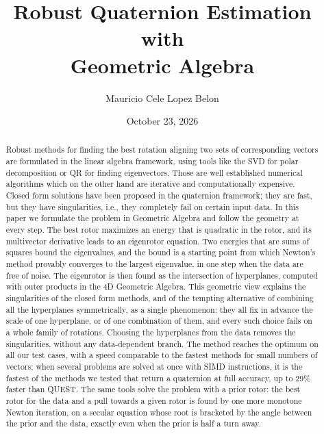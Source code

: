 \documentclass{birkjour}
\theoremstyle{definition}
\theoremstyle{remark}
\numberwithin{equation}{section}
\begin{document}
\title[Robust Quaternion Estimation with Geometric Algebra]
 {Robust Quaternion Estimation with \\Geometric Algebra}

\author[Mauricio Cele Lopez Belon]{Mauricio Cele Lopez Belon}
\address{Madrid, Spain}



\date{October 23, 2026}

\begin{abstract}
Robust methods for finding the best rotation aligning two sets of corresponding vectors are formulated in the linear algebra framework, using tools like the SVD for polar decomposition or QR for finding eigenvectors. Those are well established numerical algorithms which on the other hand are iterative and computationally expensive. Closed form solutions have been proposed in the quaternion framework; they are fast, but they have singularities, i.e., they completely fail on certain input data. In this paper we formulate the problem in Geometric Algebra and follow the geometry at every step. The best rotor maximizes an energy that is quadratic in the rotor, and its multivector derivative leads to an eigenrotor equation. Two energies that are sums of squares bound the eigenvalues, and the bound is a starting point from which Newton's method provably converges to the largest eigenvalue, in one step when the data are free of noise. The eigenrotor is then found as the intersection of hyperplanes, computed with outer products in the 4D Geometric Algebra. This geometric view explains the singularities of the closed form methods, and of the tempting alternative of combining all the hyperplanes symmetrically, as a single phenomenon: they all fix in advance the scale of one hyperplane, or of one combination of them, and every such choice fails on a whole family of rotations. Choosing the hyperplanes from the data removes the singularities, without any data-dependent branch. The method reaches the optimum on all our test cases, with a speed comparable to the fastest methods for small numbers of vectors; when several problems are solved at once with SIMD instructions, it is the fastest of the methods we tested that return a quaternion at full accuracy, up to $29\%$ faster than QUEST. The same tools solve the problem with a prior rotor: the best rotor for the data and a pull towards a given rotor is found by one more monotone Newton iteration, on a secular equation whose root is bracketed by the angle between the prior and the data, exactly even when the prior is half a turn away.
\end{abstract}
\end{document}

